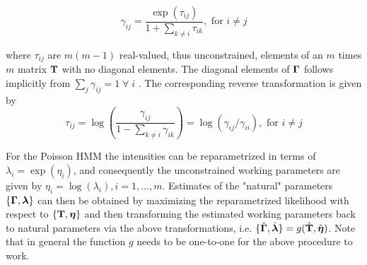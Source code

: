 \documentclass[bimj,fleqn]{w-art}\usepackage[]{graphicx}\usepackage[]{color}
\newcommand{\bct}{{\bf T}}
\newcommand{\bgamma}{\mbox{\boldmath $\Gamma$}}
\newcommand{\bfeta}{\mbox{\boldmath $\eta$}}
\newcommand{\bflambda}{\mbox{\boldmath $\lambda$}}
\theoremstyle{plain}
\theoremstyle{definition}
\begin{document}
\begin{equation*}
\gamma_{ij} = \frac{\exp(\tau_{ij})}{1 + \sum_{k \neq i} \tau_{ik}}, \text{ for } i \neq j
\end{equation*}

where $\tau_{ij}$ are $m(m-1)$ real-valued, thus unconstrained, elements of an $m$ times $m$ matrix $\bct$ with no diagonal elements. The diagonal elements of $\bgamma$ follows implicitly from $\sum_j \gamma_{ij} = 1 \;\forall\; i$ \cite[p. ~51]{zucchini}. The corresponding reverse transformation is given by
\begin{equation*}
\tau_{ij} = \log\left(\frac{\gamma_{ij}}{1 - \sum_{k \neq i} \gamma_{ik}}\right) = \log(\gamma_{ij}/\gamma_{ii}), \text{ for } i \neq j
\end{equation*}

For the Poisson HMM the intensities can be reparametrized in terms of $\lambda_i = \exp(\eta_i)$, and consequently the unconstrained working parameters are given by $\eta_i = \log(\lambda_i), i = 1,\dots,m$. Estimates of the "natural" parameters $\{\bgamma, \bflambda\}$ can then be obtained by maximizing the reparametrized likelihood with respect to $\{\bct, \bfeta\}$ and then transforming the estimated working parameters back to natural parameters via the above transformations, i.e. $\{\hat{\bgamma}, \hat{\bflambda}\} = g(\hat{\bct}, \hat{\bfeta})$. Note that in general the function $g$ needs to be one-to-one for the above procedure to work.

% 
% 
% 
% 
\end{document}
